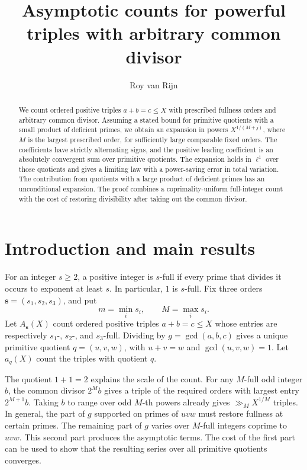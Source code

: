 \documentclass[11pt,reqno]{amsart}
\title[Asymptotic counts for powerful triples]{Asymptotic counts for powerful triples with arbitrary common divisor}
\author{Roy van Rijn}
\newcommand{\sord}{\boldsymbol{s}}
\begin{document}
\begin{abstract}
We count ordered positive triples \(a+b=c\le X\) with prescribed fullness
orders and arbitrary common divisor. Assuming a stated bound for primitive
quotients with a small product of deficient primes, we obtain an expansion in powers
\(X^{1/(M+j)}\), where \(M\) is the largest prescribed order, for sufficiently
large comparable fixed orders. The coefficients have strictly alternating
signs, and the positive leading coefficient is an absolutely convergent sum over
primitive quotients. The expansion holds in \(\ell^1\) over those quotients
and gives a limiting law with a power-saving error in total variation.
The contribution from quotients with a large product of deficient primes
has an unconditional expansion. The proof combines a coprimality-uniform
full-integer count with the cost of restoring divisibility after taking out
the common divisor.
\end{abstract}
\maketitle

\section{Introduction and main results}

For an integer \(s\ge2\), a positive integer is \(s\)-full if every prime
that divides it occurs to exponent at least \(s\). In particular, \(1\) is
\(s\)-full. Fix three orders \(\sord=(s_1,s_2,s_3)\), and put
\[
  m=\min_i s_i,\qquad M=\max_i s_i.
\]
Let \(A_{\sord}(X)\) count ordered positive triples \(a+b=c\le X\) whose
entries are respectively \(s_1\)-, \(s_2\)-, and \(s_3\)-full. Dividing by
\(g=\gcd(a,b,c)\) gives a unique primitive quotient \(q=(u,v,w)\), with
\(u+v=w\) and \(\gcd(u,v,w)=1\). Let \(a_q(X)\) count the triples with
quotient \(q\).

The quotient \(1+1=2\) explains the scale of the count. For any
\(M\)-full odd integer \(b\), the common divisor \(2^M b\) gives a triple
of the required orders with largest entry \(2^{M+1}b\). Taking \(b\) to
range over odd \(M\)-th powers already gives \(\gg_M X^{1/M}\) triples.
In general, the part of \(g\) supported on primes of \(uvw\) must restore
fullness at certain primes. The remaining part of \(g\) varies over
\(M\)-full integers coprime to \(uvw\). This second part produces the
asymptotic terms. The cost of the first part can be used to show that
the resulting series over all primitive quotients converges.
\end{document}
